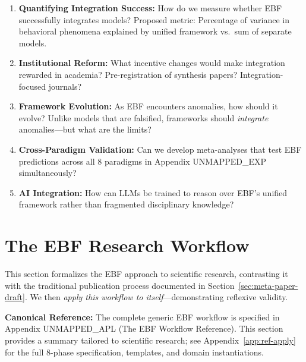 \begin{enumerate}
    \item \textbf{Quantifying Integration Success:}
    How do we measure whether EBF successfully integrates models? Proposed metric:
    Percentage of variance in behavioral phenomena explained by unified framework vs.\
    sum of separate models.

    \item \textbf{Institutional Reform:}
    What incentive changes would make integration rewarded in academia? Pre-registration
    of synthesis papers? Integration-focused journals?

    \item \textbf{Framework Evolution:}
    As EBF encounters anomalies, how should it evolve? Unlike models that are falsified,
    frameworks should \textit{integrate} anomalies—but what are the limits?

    \item \textbf{Cross-Paradigm Validation:}
    Can we develop meta-analyses that test EBF predictions across all 8 paradigms in
    Appendix UNMAPPED_EXP simultaneously?

    \item \textbf{AI Integration:}
    How can LLMs be trained to reason over EBF's unified framework rather than
    fragmented disciplinary knowledge?
\end{enumerate}



\section{The EBF Research Workflow}
\label{sec:meta-ebf-workflow}

This section formalizes the EBF approach to scientific research, contrasting it with
the traditional publication process documented in Section~\ref{sec:meta-paper-draft}.
We then \textit{apply this workflow to itself}---demonstrating reflexive validity.

\textbf{Canonical Reference:} The complete generic EBF workflow is specified in
Appendix UNMAPPED_APL (The EBF Workflow Reference). This section provides
a summary tailored to scientific research; see Appendix~\ref{app:ref-apply} for
the full 8-phase specification, templates, and domain instantiations.

